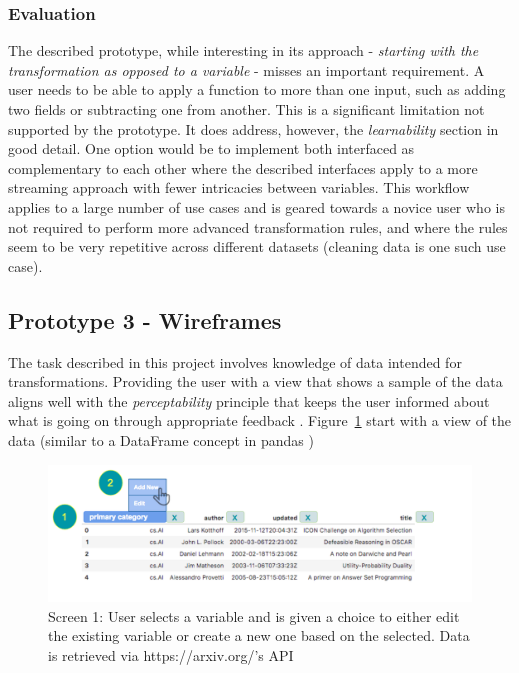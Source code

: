 \documentclass[12pt,letterpaper]{article}
\begin{document}
\subsubsection*{Evaluation} The described prototype, while interesting in its approach - \textit{starting with the transformation as opposed to a variable} - misses an important requirement. A user needs to be able to apply a function to more than one input, such as adding two fields or subtracting one from another. This is a significant limitation not supported by the prototype.  It does address, however, the \textit{learnability} section in good detail. One option would be to implement both interfaced as complementary to each other where the described interfaces apply to a more streaming approach with fewer intricacies between variables. This workflow applies to a large number of use cases and is geared towards a novice user who is not required to perform more advanced transformation rules, and where the rules seem to be very repetitive across different datasets (cleaning data is one such use case).

\subsection*{Prototype 3 - Wireframes}
The task described in this project involves knowledge of data intended for transformations. Providing the user with a view that shows a sample of the data aligns well with the \textit{perceptability} principle that keeps the user informed about what is going on through appropriate feedback \cite{nielsen1994usability}. Figure~\ref{fig::2} start with a view of the data (similar to a DataFrame concept in pandas \cite{mckinney2011pandas})

\begin{figure}[h]
\centering
\includegraphics[scale=.3]{figures/m3/wireframe-screen1.png}
\caption{Screen 1: User selects a variable and is given a choice to either edit the existing variable or create a new one based on the selected. Data is retrieved via https://arxiv.org/'s API}
\label{fig::2}
\end{figure}
\end{document}
